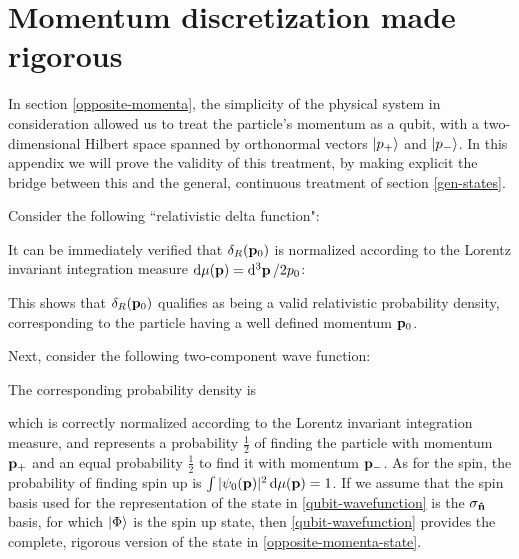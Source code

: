 \documentclass[12pt,a4paper,notitlepage]{report}
\begin{document}
\appendix

\chapter{Momentum discretization made rigorous}
\label{app-a}

In section \ref{opposite-momenta}, the simplicity of the physical system in consideration allowed us to treat the particle's momentum as a qubit, with a two-dimensional Hilbert space spanned by orthonormal vectors $\ket{p_+}$ and $\ket{p_-}$. In this appendix we will prove the validity of this treatment, by making explicit the bridge between this and the general, continuous treatment of section \ref{gen-states}.

Consider the following ``relativistic delta function":

It can be immediately verified that $\delta_R(\vb{p}_0)$ is normalized according to the Lorentz invariant integration measure $\dd{\mu(\vb{p})} = \dd[3]{\vb{p}}/2 p_0$:

%
This shows that $\delta_R(\vb{p}_0)$ qualifies as being a valid relativistic probability density, corresponding to the particle having a well defined momentum $\vb{p}_0$. 

Next, consider the following two-component wave function:

%
The corresponding probability density is

%
which is correctly normalized according to the Lorentz invariant integration measure, and represents a probability $\frac{1}{2}$ of finding the particle with momentum $\vb{p}_+$ and an equal probability $\frac{1}{2}$ to find it with momentum $\vb{p}_-$. As for the spin, the probability of finding spin up is $\int|\psi_0(\vb{p})|^2\dd{\mu(\vb{p})} = 1$. If we assume that the spin basis used for the representation of the state in \eqref{qubit-wavefunction} is the $\sigma_{\vu{n}}$ basis, for which $\ket{\Phi}$ is the spin up state, then \eqref{qubit-wavefunction} provides the complete, rigorous version of the state in \eqref{opposite-momenta-state}.
\end{document}
